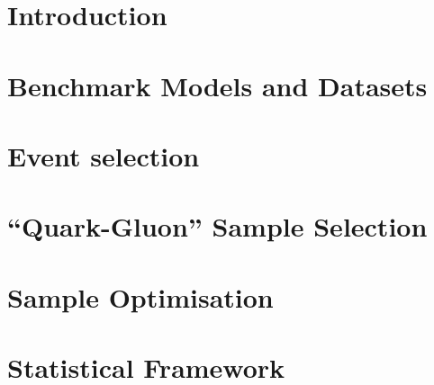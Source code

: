 \documentclass[NOTE, atlasdraft=true, texlive=2016, UKenglish]{atlasdoc}
\begin{document}
\maketitle

\tableofcontents


\section{Introduction}
\label{sec:intro}

\clearpage

\section{Benchmark Models and Datasets}
\label{sec:benchmark_signals}

\clearpage

\section{Event selection}
\label{sec:event_selection}

\clearpage


\section{``Quark-Gluon'' Sample Selection}
\label{sec:QGselection}

\clearpage

\section{Sample Optimisation}
\label{sec:Optimisation}

\clearpage



\section{Statistical Framework}
\label{sec:statistical_framework}
\end{document}
